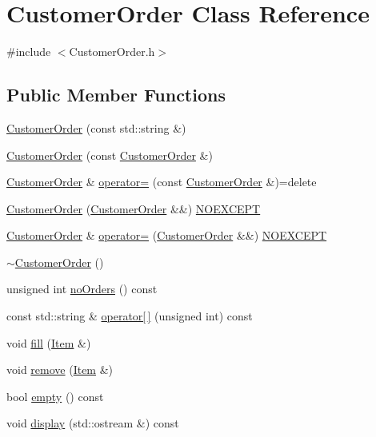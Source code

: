 \hypertarget{class_customer_order}{}\section{Customer\+Order Class Reference}
\label{class_customer_order}


{\ttfamily \#include $<$Customer\+Order.\+h$>$}

\subsection*{Public Member Functions}
\begin{DoxyCompactItemize}
\item 
\mbox{\hyperlink{class_customer_order_a0b43beee099ac2772cadd8f3df890701}{Customer\+Order}} (const std\+::string \&)
\item 
\mbox{\hyperlink{class_customer_order_ad5d7da49c28e5006f326e1709b072516}{Customer\+Order}} (const \mbox{\hyperlink{class_customer_order}{Customer\+Order}} \&)
\item 
\mbox{\hyperlink{class_customer_order}{Customer\+Order}} \& \mbox{\hyperlink{class_customer_order_ae43fcf650924cf82800c6dfe9a20afca}{operator=}} (const \mbox{\hyperlink{class_customer_order}{Customer\+Order}} \&)=delete
\item 
\mbox{\hyperlink{class_customer_order_addc080f9b7685c1c2d788b418bca40a8}{Customer\+Order}} (\mbox{\hyperlink{class_customer_order}{Customer\+Order}} \&\&) \mbox{\hyperlink{_customer_order_8h_a10a59554805ac7ce3905fd3540f98137}{N\+O\+E\+X\+C\+E\+PT}}
\item 
\mbox{\hyperlink{class_customer_order}{Customer\+Order}} \& \mbox{\hyperlink{class_customer_order_ae2af41f59a0b0856fae309779f915390}{operator=}} (\mbox{\hyperlink{class_customer_order}{Customer\+Order}} \&\&) \mbox{\hyperlink{_customer_order_8h_a10a59554805ac7ce3905fd3540f98137}{N\+O\+E\+X\+C\+E\+PT}}
\item 
\mbox{\hyperlink{class_customer_order_ae36af98287386c97b66537ac463b09c6}{$\sim$\+Customer\+Order}} ()
\item 
unsigned int \mbox{\hyperlink{class_customer_order_a371158bfa7784275a71ebfd9feb8514b}{no\+Orders}} () const
\item 
const std\+::string \& \mbox{\hyperlink{class_customer_order_a8ff1239910926e660ce7692807a7847d}{operator\mbox{[}$\,$\mbox{]}}} (unsigned int) const
\item 
void \mbox{\hyperlink{class_customer_order_a317213ffac6bc2765e573893bd3f8507}{fill}} (\mbox{\hyperlink{class_item}{Item}} \&)
\item 
void \mbox{\hyperlink{class_customer_order_a8059d5a73bfa388f86671d45835468d6}{remove}} (\mbox{\hyperlink{class_item}{Item}} \&)
\item 
bool \mbox{\hyperlink{class_customer_order_a8cfde59bf7a044e21508f5b595e3873c}{empty}} () const
\item 
void \mbox{\hyperlink{class_customer_order_a44b8223600dd858b4d4edcbe3704a5a0}{display}} (std\+::ostream \&) const
\end{DoxyCompactItemize}


